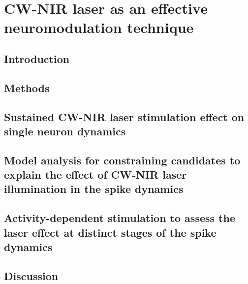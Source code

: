 \chapter{CW-NIR laser as an effective neuromodulation technique}
\label{c-laser}

\section{Introduction}
\label{sect:intro}  %



\section{Methods}
%



\section{Sustained CW-NIR laser stimulation effect on single neuron dynamics}


\section{Model analysis for constraining candidates to explain the effect of CW-NIR laser illumination in the spike dynamics}
\label{sect:models}


\section{Activity-dependent stimulation to assess the laser effect at distinct stages of the spike dynamics} 
\label{sec:activity dependent}




\section{Discussion}
